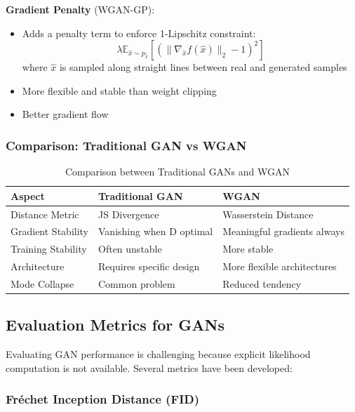 \documentclass[conference,12pt]{IEEEtran}
\begin{document}
\textbf{Gradient Penalty} (WGAN-GP):
\begin{itemize}
    \item Adds a penalty term to enforce 1-Lipschitz constraint:
    \begin{equation}
        \lambda \mathbb{E}_{\hat{x} \sim p_{\hat{x}}} \left[ (\|\nabla_{\hat{x}} f(\hat{x})\|_2 - 1)^2 \right]
    \end{equation}
    where $\hat{x}$ is sampled along straight lines between real and generated samples
    \item More flexible and stable than weight clipping
    \item Better gradient flow
\end{itemize}

\subsubsection{Comparison: Traditional GAN vs WGAN}

\begin{table}[!t]
\renewcommand{\arraystretch}{1.3}
\caption{Comparison between Traditional GANs and WGAN}
\label{tab:gan_comparison}
\centering
\begin{tabular}{|p{2cm}|p{3cm}|p{3cm}|}
\hline
Aspect & Traditional GAN & WGAN \\
\hline
Distance Metric & JS Divergence & Wasserstein Distance \\
\hline
Gradient Stability & Vanishing when D optimal & Meaningful gradients always \\
\hline
Training Stability & Often unstable & More stable \\
\hline
Architecture & Requires specific design & More flexible architectures \\
\hline
Mode Collapse & Common problem & Reduced tendency \\
\hline
\end{tabular}
\end{table}

\subsection{Evaluation Metrics for GANs}

Evaluating GAN performance is challenging because explicit likelihood computation is not available. Several metrics have been developed:

\subsubsection{Fréchet Inception Distance (FID)}
\end{document}
